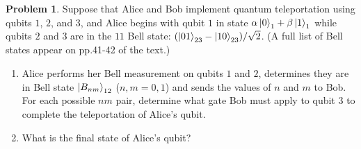 \documentclass[10pt]{article}
\theoremstyle{definition}
\newtheorem{problem}{Problem}
\begin{document}
\begin{problem}
Suppose that Alice and Bob implement quantum teleportation using qubits
$1$, $2$, and $3$, and Alice begins with qubit $1$ in state $\alpha\ket{0}_1+\beta\ket{1}_1$ while qubits $2$ and $3$ are in
the $11$ Bell state: $(\ket{01}_{23}-\ket{10}_{23})/\sqrt{2}$. (A full list of Bell states appear on pp.41-42 of the
text.)
\begin{enumerate}[label=(\alph*)]
  \item Alice performs her Bell measurement on qubits $1$ and $2$, determines they are in Bell state
        $\ket{B_{nm}}_{12}$ ($n, m = 0, 1$) and sends the values of $n$ and $m$ to Bob. For each possible $nm$ pair,
        determine what gate Bob must apply to qubit 3 to complete the teleportation of Alice's
        qubit.
  \item What is the final state of Alice's qubit?
\end{enumerate}
\end{problem}
\end{document}
